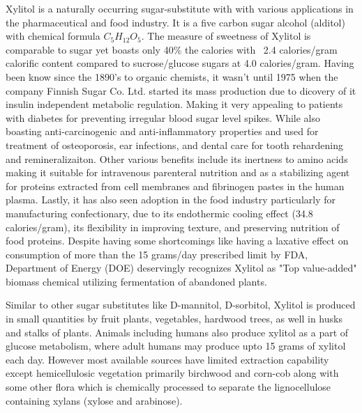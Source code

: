 \documentclass{main}
\begin{document}
Xylitol is a naturally occurring sugar-substitute with with various applications in the pharmaceutical and food industry. It is a five carbon sugar alcohol (alditol) with chemical formula $C_5H_{12}O_5$. The measure of sweetness of Xylitol is comparable to sugar yet boasts only 40\% the calories with ~2.4 calories/gram calorific content compared to sucrose/glucose sugars at 4.0 calories/gram. Having been know since the 1890's to organic chemists, it wasn't until 1975 when the company Finnish Sugar Co. Ltd. started its mass production due to dicovery of it insulin independent metabolic regulation. Making it very appealing to patients with diabetes for preventing irregular blood sugar level spikes. While also boasting anti-carcinogenic and anti-inflammatory properties and used for treatment of osteoporosis, ear infections, and dental care for tooth rehardening and remineralizaiton. Other various benefits include its inertness to amino acids making it suitable for intravenous parenteral nutrition and as a stabilizing agent for proteins extracted from cell membranes and fibrinogen pastes in the human plasma. Lastly, it has also seen adoption in the food industry particularly for manufacturing confectionary, due to its endothermic cooling effect (34.8 calories/gram), its flexibility in improving texture, and preserving nutrition of food proteins. Despite having some shortcomings like having a laxative effect on consumption of more than the 15 grams/day prescribed limit by FDA, Department of Energy (DOE) deservingly recognizes Xylitol as "Top value-added" biomass chemical utilizing fermentation of abandoned plants.



Similar to other sugar substitutes like D-mannitol, D-sorbitol, Xylitol is produced in small quantities by fruit plants, vegetables, hardwood trees, as well in husks and stalks of plants. Animals including humans also produce xylitol as a part of glucose metabolism, where adult humans may produce upto 15 grams of xylitol each day. However most available sources have limited extraction capability except hemicellulosic vegetation primarily birchwood and corn-cob along with some other flora which is chemically processed to separate the lignocellulose containing xylans (xylose and arabinose).

\end{document}
